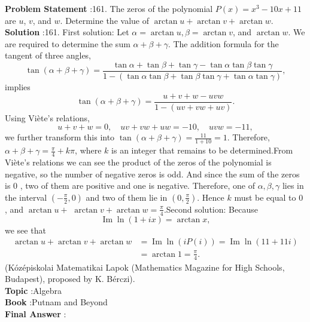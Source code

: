 \documentclass[10pt]{article}
\begin{document}
\textbf{Problem Statement} :161. The zeros of the polynomial $P(x)=x^{3}-10 x+11$ are $u$, $v$, and $w$. Determine the value of $\arctan u+\arctan v+\arctan w$.\\
\textbf{Solution} :161. First solution: Let $\alpha=\arctan u, \beta=\arctan v$, and $\arctan w$. We are required to determine the sum $\alpha+\beta+\gamma$. The addition formula for the tangent of three angles, $$ \tan (\alpha+\beta+\gamma)=\frac{\tan \alpha+\tan \beta+\tan \gamma-\tan \alpha \tan \beta \tan \gamma}{1-(\tan \alpha \tan \beta+\tan \beta \tan \gamma+\tan \alpha \tan \gamma)}, $$implies$$ \tan (\alpha+\beta+\gamma)=\frac{u+v+w-u v w}{1-(u v+v w+u v)} . $$Using Viète's relations,$$ u+v+w=0, \quad u v+v w+u w=-10, \quad u v w=-11, $$we further transform this into $\tan (\alpha+\beta+\gamma)=\frac{11}{1+10}=1$. Therefore, $\alpha+\beta+\gamma=\frac{\pi}{4}+k \pi$, where $k$ is an integer that remains to be determined.From Viète's relations we can see the product of the zeros of the polynomial is negative, so the number of negative zeros is odd. And since the sum of the zeros is 0 , two of them are positive and one is negative. Therefore, one of $\alpha, \beta, \gamma$ lies in the interval $\left(-\frac{\pi}{2}, 0\right)$ and two of them lie in $\left(0, \frac{\pi}{2}\right)$. Hence $k$ must be equal to 0 , and $\arctan u+$ $\arctan v+\arctan w=\frac{\pi}{4}$.Second solution: Because$$ \operatorname{Im} \ln (1+i x)=\arctan x, $$we see that$$ \begin{aligned} \arctan u+\arctan v+\arctan w &=\operatorname{Im} \ln (i P(i))=\operatorname{Im} \ln (11+11 i) \\ &=\arctan 1=\frac{\pi}{4} . \end{aligned} $$(Kózépiskolai Matematikai Lapok (Mathematics Magazine for High Schools, Budapest), proposed by K. Bérczi).\\
\textbf{Topic} :Algebra\\
\textbf{Book} :Putnam and Beyond\\
\textbf{Final Answer} :\\
\end{document}
